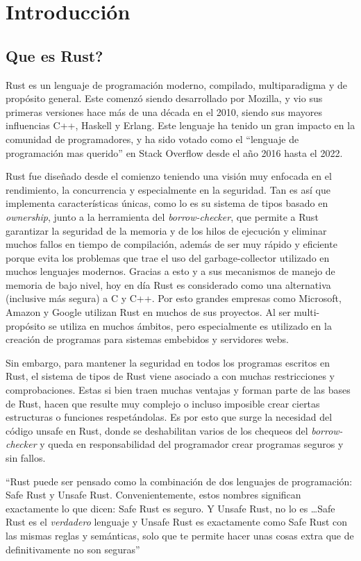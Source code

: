 \chapter{Introducción}

\section{Que es Rust?}

Rust es un lenguaje de programación moderno, compilado, multiparadigma y de propósito general. Este comenzó siendo desarrollado por Mozilla, y vio sus primeras versiones hace más de una década en el 2010, siendo sus mayores influencias C++, Haskell y Erlang. Este lenguaje ha tenido un gran impacto en la comunidad de programadores, y ha sido votado como el “lenguaje de programación mas querido” en Stack Overflow desde el año 2016 hasta el 2022.

Rust fue diseñado desde el comienzo teniendo una visión muy enfocada en el rendimiento, la concurrencia y especialmente en la seguridad. Tan es así que implementa características únicas, como lo es su sistema de tipos basado en \textit{ownership}, junto a la herramienta del \textit{borrow-checker}, que permite a Rust garantizar la seguridad de la memoria y de los hilos de ejecución y eliminar muchos fallos en tiempo de compilación, además de ser muy rápido y eficiente porque evita los problemas que trae el uso del garbage-collector utilizado en muchos lenguajes modernos. Gracias a esto y a sus mecanismos de manejo de memoria de bajo nivel, hoy en día Rust es considerado como una alternativa (inclusive más segura) a C y C++. Por esto grandes empresas como Microsoft, Amazon y Google utilizan Rust en muchos de sus proyectos. Al ser multi-propósito se utiliza en muchos ámbitos, pero especialmente es utilizado en la creación de programas para sistemas embebidos y servidores webs.

Sin embargo, para mantener la seguridad en todos los programas escritos en Rust, el sistema de tipos de Rust viene asociado a con muchas restricciones y comprobaciones. Estas si bien traen muchas ventajas y forman parte de las bases de Rust, hacen que resulte muy complejo o incluso imposible crear ciertas estructuras o funciones respetándolas. Es por esto que surge la necesidad del código unsafe en Rust, donde se deshabilitan varios de los chequeos del \textit{borrow-checker} y queda en responsabilidad del programador crear programas seguros y sin fallos.

``Rust puede ser pensado como la combinación de dos lenguajes de programación: Safe Rust y Unsafe Rust. Convenientemente, estos nombres significan exactamente lo que dicen: Safe Rust es seguro. Y Unsafe Rust, no lo es \dots Safe Rust es el \textit{verdadero} lenguaje y Unsafe Rust es exactamente como Safe Rust con las mismas reglas y semánticas, solo que te permite hacer unas cosas extra que de definitivamente no son seguras'' \citep{rustonomicon}

